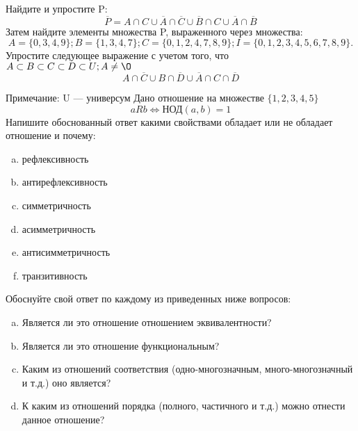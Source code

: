 \documentclass[10pt]{exam}
\begin{document}
\begin{questions}
\question
Найдите и упростите P:
\begin{equation*}
\overline{P} = A \cap C \cup \overline{A} \cap \overline{C} \cup \overline{B} \cap C \cup \overline{A} \cap \overline{B}
\end{equation*}
Затем найдите элементы множества P, выраженного через множества:
\begin{equation*}
A = \{0, 3, 4, 9\}; 
B = \{1, 3, 4, 7\};
C = \{0, 1, 2, 4, 7, 8, 9\};
I = \{0, 1, 2, 3, 4, 5, 6, 7, 8, 9\}.
\end{equation*}\question
Упростите следующее выражение с учетом того, что $A\subset B \subset C \subset D \subset U; A \neq \O$
\begin{equation*}
A \cap  \overline{C} \cup B \cap \overline{D} \cup  \overline{A} \cap C \cap  \overline{D}
\end{equation*}

Примечание: U — универсум\question
Дано отношение на множестве $\{1, 2, 3, 4, 5\}$ 
\begin{equation*}
aRb \iff  \text{НОД}(a,b) =1
\end{equation*}
Напишите обоснованный ответ какими свойствами обладает или не обладает отношение и почему:   
\begin{enumerate} [a)]\setcounter{enumi}{0}
\item рефлексивность
\item антирефлексивность
\item симметричность
\item асимметричность
\item антисимметричность
\item транзитивность
\end{enumerate}

Обоснуйте свой ответ по каждому из приведенных ниже вопросов:
\begin{enumerate} [a)]\setcounter{enumi}{0}
    \item Является ли это отношение отношением эквивалентности?
    \item Является ли это отношение функциональным?
    \item Каким из отношений соответствия (одно-многозначным, много-многозначный и т.д.) оно является?
    \item К каким из отношений порядка (полного, частичного и т.д.) можно отнести данное отношение?
\end{enumerate}



\end{questions}
\end{document}
